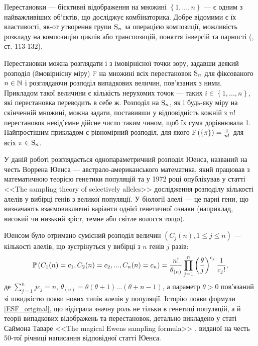 Перестановки --- бієктивні відображення на множині
$\left\{1, ..., n\right\}$ --- є одним з найважливіших об'єктів, 
що досліджує комбінаторика.
Добре відомими є їх властивості, як-от
утворення групи $\Sym{n}$ за операцією композиції, можливість розкладу 
на композицію циклів або транспозицій, поняття інверсій та парності (\cite{Spectorsky}, ст. 113-132).

Перестановки можна розглядати і з імовірнісної точки зору,
задавши деякий розподіл (ймовірнісну міру) $\mathbb{P}$ на множині всіх
перестановок $\Sym{n}$ для фіксованого $n \in \N$ і розглядаючи
розподіл випадкових величин, пов'язаних з ними. Прикладом такої
величини є кількість нерухомих точок --- таких 
$i \in \left\{1,...,n\right\}$, які перестановка переводить в себе ж.
Розподіл на $\Sym{n}$, як і будь-яку міру на скінченній множині,
можна задати, поставивши у відповідність кожній з $n!$ перестановок
невід'ємне дійсне число таким чином, щоб їх сума дорівнювала 1.
Найпростішим прикладом є рівномірний розподіл, для якого
$\P{\left\{ \pi \right\}} = \frac{1}{n!}$ для всіх $\pi \in \Sym{n}$.

У даній роботі розглядається однопараметричний розподіл Юенса, 
названий на честь Воррена Юенса --- австрало-американського математика,
який працював з математичною теорією генетики популяцій 
та у 1972 році опублікував у статті <<The sampling theory of selectively alleles>> \cite{EWENS197287}
дослідження розподілу кількості алелів у вибірці генів з великої популяції.
У біології алелі --- це парні гени, що визначають взаємовиключні варіанти
однієї генетичної ознаки (наприклад, високий чи низький зріст, темне або світле волосся тощо).

Юенсом було отримано сумісний розподіл величин 
$\left(C_j(n), 1 \leq j \leq n\right)$ ---
кількості алелів, що зустрінуться у вибірці з $n$ генів $j$ разів:
\begin{gather}\label{ESF_original}
    \P{
        C_1(n) = c_1, C_2(n) = c_2, ..., C_n(n) = c_n
    } = 
    \frac{n!}{\theta_{(n)}} 
    \prod_{j=1}^n \left(\frac{\theta}{j}\right)^{c_j} \frac{1}{c_j!},
\end{gather}
де $\sum_{j=1}^n j c_j = n$, $\theta_{(n)} = \theta (\theta + 1) \dots (\theta + n - 1)$,
а параметр $\theta > 0$ пов'язаний зі швидкістю появи нових типів алелів у популяції.
Історію появи формули \eqref{ESF_original}, що відіграла значну роль не тільки
в генетиці популяцій, а й теорії випадкових відображень та перестановок,
детально викладено у статі Саймона Таваре <<The magical Ewens sampling formula>> \cite{Tavare},
виданої на честь 50-тої річниці написання відповідної статті Юенса.

